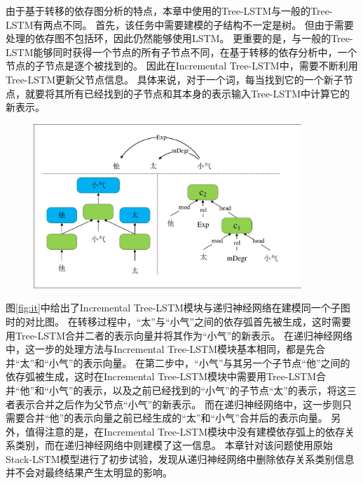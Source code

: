 由于基于转移的依存图分析的特点，本章中使用的Tree-LSTM与一般的Tree-LSTM有两点不同。
首先，该任务中需要建模的子结构不一定是树。
但由于需要处理的依存图不包括环，因此仍然能够使用LSTM。
更重要的是，与一般的Tree-LSTM能够同时获得一个节点的所有子节点不同，在基于转移的依存分析中，一个节点的子节点是逐个被找到的。
因此在Incremental Tree-LSTM中，需要不断利用Tree-LSTM更新父节点信息。
具体来说，对于一个词，每当找到它的一个新子节点，就要将其所有已经找到的子节点和其本身的表示输入Tree-LSTM中计算它的新表示。

\begin{figure}[hbtp]
	\centering
	\includegraphics[width=0.9\textwidth]{figures/it.pdf}
\end{figure}

图\ref{fig:it}中给出了Incremental Tree-LSTM模块与递归神经网络在建模同一个子图时的对比图。
在转移过程中，“太”与“小气”之间的依存弧首先被生成，这时需要用Tree-LSTM合并二者的表示向量并将其作为“小气”的新表示。
在递归神经网络中，这一步的处理方法与Incremental Tree-LSTM模块基本相同，都是先合并“太”和“小气”的表示向量。
在第二步中，“小气”与其另一个子节点“他”之间的依存弧被生成，这时在Incremental Tree-LSTM模块中需要用Tree-LSTM合并“他”和“小气”的表示，以及之前已经找到的“小气”的子节点“太”的表示，将这三者表示合并之后作为父节点“小气”的新表示。
而在递归神经网络中，这一步则只需要合并“他”的表示向量之前已经生成的“太”和“小气”合并后的表示向量。
另外，值得注意的是，在Incremental Tree-LSTM模块中没有建模依存弧上的依存关系类别，而在递归神经网络中则建模了这一信息。
本章针对该问题使用原始Stack-LSTM模型进行了初步试验，发现从递归神经网络中删除依存关系类别信息并不会对最终结果产生太明显的影响。

